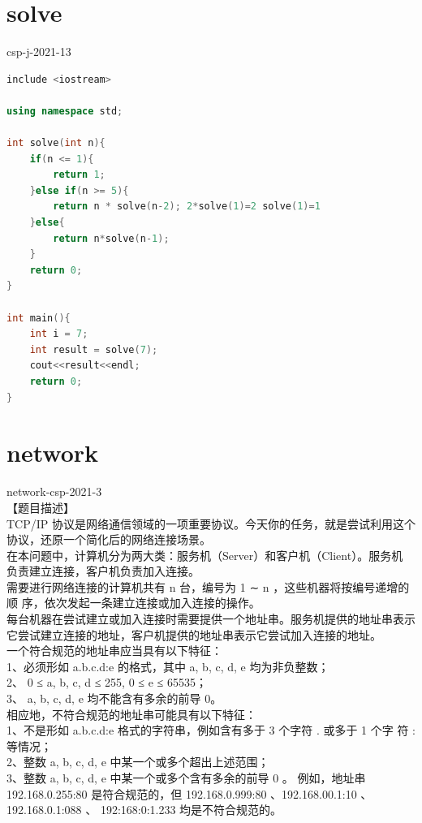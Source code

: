 \documentclass[12pt,twiside,a4paper]{ctexbook}
\numberwithin{chapter}{part}
\begin{document}
\section{solve}
csp-j-2021-13\\
\begin{lstlisting}[language=C++,breaklines = true]
include <iostream>

using namespace std;

int solve(int n){
	if(n <= 1){
		return 1;
	}else if(n >= 5){
		return n * solve(n-2); 2*solve(1)=2 solve(1)=1
	}else{
		return n*solve(n-1);
	}
	return 0;
}

int main(){
	int i = 7;
	int result = solve(7);
	cout<<result<<endl;
	return 0;
}
\end{lstlisting}

\section{network}
network-csp-2021-3\\
【题目描述】\\
TCP/IP 协议是网络通信领域的一项重要协议。今天你的任务，就是尝试利用这个
协议，还原一个简化后的网络连接场景。\\
在本问题中，计算机分为两大类：服务机（Server）和客户机（Client）。服务机
负责建立连接，客户机负责加入连接。\\
需要进行网络连接的计算机共有 n 台，编号为 1 ∼ n ，这些机器将按编号递增的顺
序，依次发起一条建立连接或加入连接的操作。\\
每台机器在尝试建立或加入连接时需要提供一个地址串。服务机提供的地址串表示
它尝试建立连接的地址，客户机提供的地址串表示它尝试加入连接的地址。\\
一个符合规范的地址串应当具有以下特征：\\
1、必须形如 a.b.c.d:e 的格式，其中 a, b, c, d, e 均为非负整数；\\
2、 0 ≤ a, b, c, d ≤ 255, 0 ≤ e ≤ 65535；\\
3、 a, b, c, d, e 均不能含有多余的前导 0。\\
相应地，不符合规范的地址串可能具有以下特征：\\
1、不是形如 a.b.c.d:e 格式的字符串，例如含有多于 3 个字符 . 或多于 1 个字
符 : 等情况；\\
2、整数 a, b, c, d, e 中某一个或多个超出上述范围；\\
3、整数 a, b, c, d, e 中某一个或多个含有多余的前导 0 。
例如，地址串 192.168.0.255:80 是符合规范的，但 192.168.0.999:80 、192.168.00.1:10
、 192.168.0.1:088 、 192:168:0:1.233 均是不符合规范的。
\end{document}
